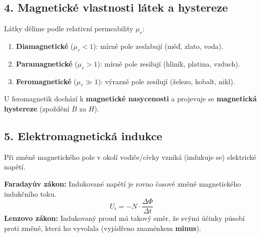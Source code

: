 \documentclass[a4paper,10pt]{article}
\newcommand{\jednotka}[1]{\,[\mathrm{#1}]}
\begin{document}
\begin{vysvetlenibox}
\subsection*{4. Magnetické vlastnosti látek a hystereze}

Látky dělíme podle relativní permeability $\mu_r$:
\begin{enumerate}
  \item \textbf{Diamagnetické} ($\mu_r < 1$): mírně pole zeslabují (měď, zlato, voda).
  \item \textbf{Paramagnetické} ($\mu_r > 1$): mírně pole zesilují (hliník, platina, vzduch).
  \item \textbf{Feromagnetické} ($\mu_r \gg 1$): výrazně pole zesilují (železo, kobalt, nikl).
\end{enumerate}

U feromagnetik dochází k \textbf{magnetické nasycenosti} a projevuje se \textbf{magnetická hystereze} (zpoždění $B$ za $H$).

\begin{center}
\end{center}

\subsection*{5. Elektromagnetická indukce}

Při změně magnetického pole v okolí vodiče/cívky vzniká (indukuje se) elektrické napětí.

\begin{durazbox}
\textbf{Faradayův zákon:} Indukované napětí je rovno časové změně magnetického indukčního toku.
\[
U_i = - N \cdot \frac{\Delta \Phi}{\Delta t}
\]
\textbf{Lenzovo zákon:} Indukovaný proud má takový směr, že svými účinky působí proti změně, která ho vyvolala (vyjádřeno znaménkem \textbf{minus}).
\end{durazbox}


\end{vysvetlenibox}
\end{document}
